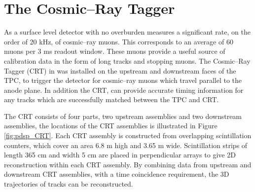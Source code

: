 \section{The Cosmic--Ray Tagger} \label{sec:pdsp_cosmic}

As a surface level detector with no overburden \protodune{} measures a
significant rate, on the order of 20 kHz, of cosmic--ray muons. This corresponds
to an average of 60 muons per 3 ms readout window. These muons provide a 
useful source of calibration data in the form of long tracks and stopping 
muons.  The Cosmic--Ray Tagger (CRT) in \protodune{} was installed on the 
upstream and downstream faces of the TPC, to trigger the detector for 
cosmic--ray muons which travel parallel to the anode plane. In addition the 
CRT, can provide accurate timing information for any tracks which are
successfully matched between the TPC and CRT.

The CRT consists of four parts, two upstream assemblies and two downstream
assemblies, the locations of the CRT assemblies is illustrated in Figure
\ref{fig:pdsp_CRT}. Each CRT assembly is constructed from overlapping 
scintillation counters, which cover an area 6.8 m high and 3.65 m wide. 
Scintillation strips of length 365 cm and width 5 cm are placed in 
perpendicular arrays to give 2D reconstruction within each CRT 
assembly. By combining data from upstream and downstream CRT assemblies, with a 
time coincidence requirement, the 3D trajectories of tracks can be 
reconstructed.

